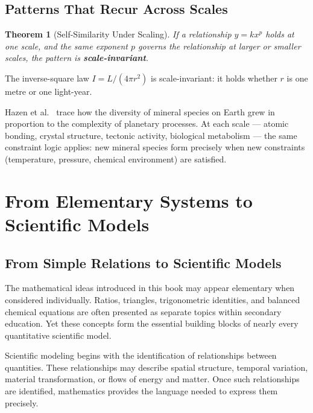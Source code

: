 \documentclass[11pt, openany]{book}
\theoremstyle{plain}
\newtheorem{theorem}{Theorem}[chapter]
\theoremstyle{definition}
\theoremstyle{remark}
\begin{document}
\section{Patterns That Recur Across Scales}

\begin{theorem}[Self-Similarity Under Scaling]
If a relationship $y=kx^p$ holds at one scale, and the same exponent $p$
governs the relationship at larger or smaller scales, the pattern is
\textbf{scale-invariant}.
\end{theorem}

The inverse-square law $I=L/(4\pi r^2)$ is scale-invariant: it holds whether
$r$ is one metre or one light-year.

\begin{myexample}
Hazen et al.\ \citep{Hazen2008} trace how the diversity of mineral species on
Earth grew in proportion to the complexity of planetary processes. At each
scale --- atomic bonding, crystal structure, tectonic activity, biological
metabolism --- the same constraint logic applies: new mineral species form
precisely when new constraints (temperature, pressure, chemical environment)
are satisfied.
\end{myexample}

\chapter{From Elementary Systems to Scientific Models}

\section*{From Simple Relations to Scientific Models}

The mathematical ideas introduced in this book may appear elementary when
considered individually. Ratios, triangles, trigonometric identities, and
balanced chemical equations are often presented as separate topics within
secondary education. Yet these concepts form the essential building blocks
of nearly every quantitative scientific model.

Scientific modeling begins with the identification of relationships between
quantities. These relationships may describe spatial structure, temporal
variation, material transformation, or flows of energy and matter. Once
such relationships are identified, mathematics provides the language
needed to express them precisely.
\end{document}
